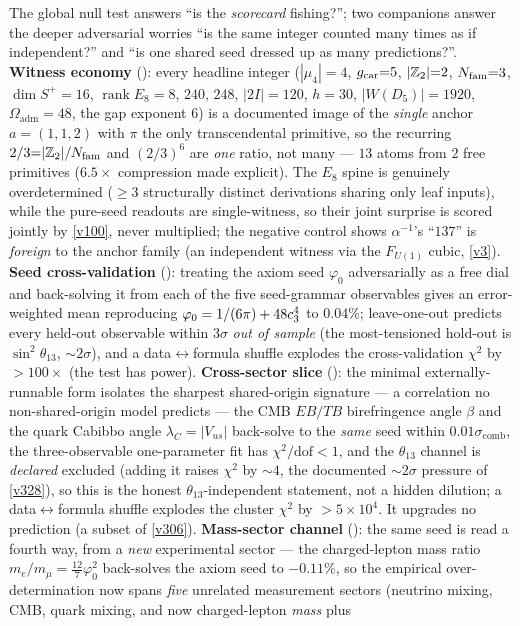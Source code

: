 \begin{winbox}
The global null test answers ``is the \emph{scorecard} fishing?''; two companions answer the deeper adversarial worries ``is the same integer counted many times as if independent?'' and ``is one shared seed dressed up as many predictions?''. \textbf{Witness economy} (): every headline integer ($|\mu_4|{=}4$, $g_{\mathrm{car}}{=}5$, $|\mathbb{Z}_2|{=}2$, $N_{\mathrm{fam}}{=}3$, $\dim S^+{=}16$, $\operatorname{rank}E_8{=}8$, $240$, $248$, $|2I|{=}120$, $h{=}30$, $|W(D_5)|{=}1920$, $\Omega_{\mathrm{adm}}{=}48$, the gap exponent $6$) is a documented image of the \emph{single} anchor $a{=}(1,1,2)$ with $\pi$ the only transcendental primitive, so the recurring $2/3{=}|\mathbb{Z}_2|/N_{\mathrm{fam}}$ and $(2/3)^6$ are \emph{one} ratio, not many --- $13$ atoms from $2$ free primitives ($6.5\times$ compression made explicit). The $E_8$ spine is genuinely overdetermined ($\ge3$ structurally distinct derivations sharing only leaf inputs), while the pure-seed readouts are single-witness, so their joint surprise is scored jointly by \vref{v100}, never multiplied; the negative control shows $\alpha^{-1}$'s ``$137$'' is \emph{foreign} to the anchor family (an independent witness via the $F_{U(1)}$ cubic, \vref{v3}). \textbf{Seed cross-validation} (): treating the axiom seed $\varphi_0$ adversarially as a free dial and back-solving it from each of the five seed-grammar observables gives an error-weighted mean reproducing $\varphi_0=1/(6\pi)+48c_3^4$ to $0.04\%$; leave-one-out predicts every held-out observable within $3\sigma$ \emph{out of sample} (the most-tensioned hold-out is $\sin^2\theta_{13}$, ${\sim}2\sigma$), and a data$\leftrightarrow$formula shuffle explodes the cross-validation $\chi^2$ by $>100\times$ (the test has power). \textbf{Cross-sector slice} (): the minimal externally-runnable form isolates the sharpest shared-origin signature --- a correlation no non-shared-origin model predicts --- the CMB $EB/TB$ birefringence angle $\beta$ and the quark Cabibbo angle $\lambda_C{=}|V_{us}|$ back-solve to the \emph{same} seed within $0.01\sigma_{\mathrm{comb}}$, the three-observable one-parameter fit has $\chi^2/\mathrm{dof}{<}1$, and the $\theta_{13}$ channel is \emph{declared} excluded (adding it raises $\chi^2$ by ${\sim}4$, the documented ${\sim}2\sigma$ pressure of \vref{v328}), so this is the honest $\theta_{13}$-independent statement, not a hidden dilution; a data$\leftrightarrow$formula shuffle explodes the cluster $\chi^2$ by ${>}5{\times}10^4$. It upgrades no prediction (a subset of \vref{v306}). \textbf{Mass-sector channel} (): the same seed is read a fourth way, from a \emph{new} experimental sector --- the charged-lepton mass ratio $m_e/m_\mu{=}\tfrac{12}{7}\varphi_0^2$ back-solves the axiom seed to $-0.11\%$, so the empirical over-determination now spans \emph{five} unrelated measurement sectors (neutrino mixing, CMB, quark mixing, and now charged-lepton \emph{mass} plus 
\end{winbox}
